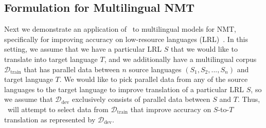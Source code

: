 \subsection{\label{sec:nmt_method}Formulation for Multilingual NMT}

Next we demonstrate an application of \dds~to multilingual models for NMT, specifically for improving accuracy on low-resource languages (LRL)~\citep{nmt_transfer,rapid_adapt_nmt}.
In this setting, we assume that we have a particular LRL $S$ that we would like to translate into target language $T$, and we additionally have a multilingual corpus $\mathcal{D}_{\text{train}}$ that has parallel data between $n$ source languages $(S_1, S_2, ..., S_n)$ and target language $T$.
We would like to pick parallel data from any of the source languages to the target language to improve translation of a particular LRL $S$, so we assume that $\mathcal{D}_{\text{dev}}$ exclusively consists of parallel data between $S$ and $T$.
Thus, \dds~will attempt to select data from $\mathcal{D}_{\text{train}}$ that improve accuracy on $S$-to-$T$ translation as represented by $\mathcal{D}_{\text{dev}}$.
    \vspace{-0.2cm}
